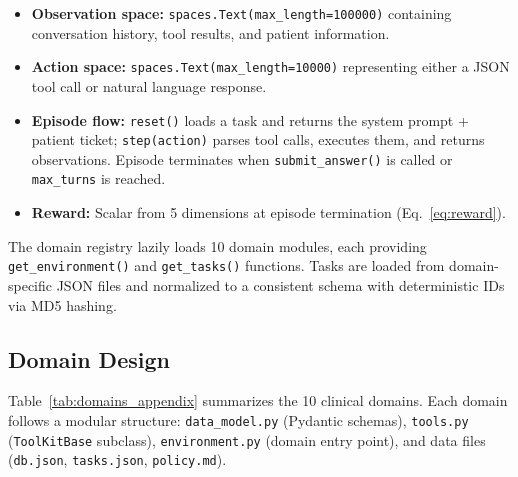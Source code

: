 \documentclass{article}
\begin{document}
\begin{itemize}[leftmargin=*,itemsep=1pt]
    \item \textbf{Observation space:} \texttt{spaces.Text(max\_length=100000)} containing conversation history, tool results, and patient information.
    \item \textbf{Action space:} \texttt{spaces.Text(max\_length=10000)} representing either a JSON tool call or natural language response.
    \item \textbf{Episode flow:} \texttt{reset()} loads a task and returns the system prompt + patient ticket; \texttt{step(action)} parses tool calls, executes them, and returns observations. Episode terminates when \texttt{submit\_answer()} is called or \texttt{max\_turns} is reached.
    \item \textbf{Reward:} Scalar from 5 dimensions at episode termination (Eq.~\ref{eq:reward}).
\end{itemize}

The domain registry lazily loads 10 domain modules, each providing \texttt{get\_environment()} and \texttt{get\_tasks()} functions. Tasks are loaded from domain-specific JSON files and normalized to a consistent schema with deterministic IDs via MD5 hashing.

\subsection{Domain Design}

Table~\ref{tab:domains_appendix} summarizes the 10 clinical domains. Each domain follows a modular structure: \texttt{data\_model.py} (Pydantic schemas), \texttt{tools.py} (\texttt{ToolKitBase} subclass), \texttt{environment.py} (domain entry point), and data files (\texttt{db.json}, \texttt{tasks.json}, \texttt{policy.md}).
\end{document}
